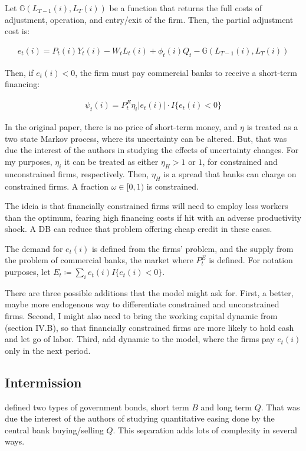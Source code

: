 \documentclass[12pt]{article}
\begin{document}
Let $\mathbb G(L_{T-1}(i), L_T(i))$ be a function that returns the full costs of adjustment, operation, and entry/exit of the firm. Then, the partial adjustment cost is: 

\begin{align*}
    e_t(i) = P_t(i)Y_t(i) - W_tL_t(i) + \phi_t(i)Q_t - \mathbb G(L_{T-1}(i), L_T(i))
\end{align*}

Then, if $e_t(i) < 0$, the firm must pay commercial banks to receive a short-term financing:

\begin{align*}
    \psi_t(i) = P^E_t\eta_i |e_t(i)| \cdot I{\{e_t(i) < 0\}}
\end{align*}

In the original paper, there is no price of short-term money, and $\eta$ is treated as a two state Markov process, where its uncertainty can be altered. But, that was due the interest of the authors in studying the effects of uncertainty changes. For my purposes, $\eta_i$ it can be treated as either $\eta_H > 1$ or $1$, for constrained and unconstrained firms, respectively. Then, $\eta_H$ is a spread that banks can charge on constrained firms. A fraction $\omega \in [0,1)$ is constrained.

The ideia is that financially constrained firms will need to employ less workers than the optimum, fearing high financing costs if hit with an adverse productivity shock. A DB can reduce that problem offering cheap credit in these cases.

The demand for $e_t(i)$ is defined from the firms' problem, and the supply from the problem of commercial banks, the market where $P^E_t$ is defined. For notation purposes, let $E_t \coloneqq \sum_i e_t(i)I\{e_t(i) < 0\}$.

There are three possible additions that the model might ask for. First, a better, maybe more endogenous way to differentiate constrained and unconstrained firms. Second, I might also need to bring the working capital dynamic from \cite{alfaro_2024} (section IV.B), so that financially constrained firms are more likely to hold cash and let go of labor. Third, add dynamic to the model, where the firms pay $e_t(i)$ only in the next period.


\subsection*{Intermission}

\cite{ellison_2014} defined two types of government bonds, short term $B$ and long term $Q$. That was due the interest of the authors of studying quantitative easing done by the central bank buying/selling $Q$. This separation adds lots of complexity in several ways.
\end{document}
